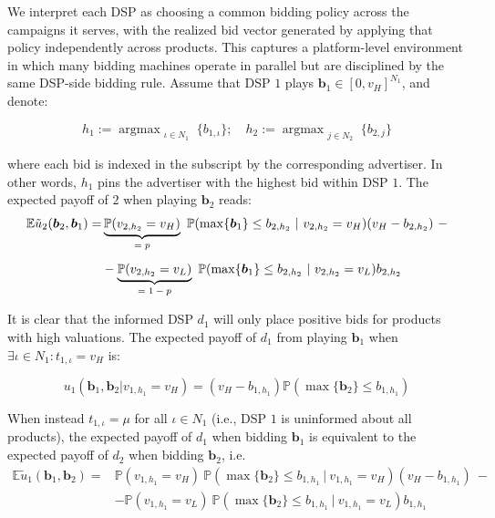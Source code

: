 \documentclass[11pt]{article}
\DeclareMathOperator*{\argmax}{argmax}
\theoremstyle{plain}
\theoremstyle{definition}
\theoremstyle{plain}
\theoremstyle{plain}
\theoremstyle{plain}
\theoremstyle{plain}
\numberwithin{equation}{section}
\begin{document}
\noindent We interpret each DSP as choosing a common bidding policy across the campaigns it serves, with the realized bid vector generated by applying that policy independently across products. This captures a platform-level environment in which many bidding machines operate in parallel but are disciplined by the same DSP-side bidding rule. Assume that DSP $1$ plays $ \bm{b}_1 \in [0,v_H]^{N_1} $, and denote:

\begin{equation*}
h_1 := \argmax_{\substack{\iota \in N_1}} \{ b_{1, \iota }\}; \quad h_2 := \argmax_{\substack{j \in N_2}} \{ b_{2, j} \}
\end{equation*}

\vspace{0.2cm}

\noindent where each bid is indexed in the subscript by the corresponding advertiser. In other words, $h_1$ pins the advertiser with the highest bid within DSP $1$. The expected payoff of $ 2 $ when playing $ \bm{b}_2$ reads:
\begin{align*}
\mathbb{E} \tilde{u}_2 (\bm{b}_2, \bm{b}_1) = & \underbrace{\mathbb{P}(v_{2,h_2} = v_H)}_\text{$ = p $} \ \mathbb{P}(\max \{ \bm{b}_1 \} \leq b_{2, h_2} \ | \ v_{2,h_2} = v_H) (v_H - b_{2, h_2}) \ - \\[5pt]
&- \underbrace{\mathbb{P}(v_{2,h_2} = v_L)}_\text{$ = 1 - p $} \ \mathbb{P}(\max \{ \bm{b}_1 \} \leq b_{2, h_2} \ | \ v_{2,h_2}  = v_L) b_{2, h_2}
\end{align*}

\vspace{0.2cm}

\noindent It is clear that the informed DSP $ d_1 $ will only place positive bids for products with high valuations. The expected payoff of $ d_1 $ from playing $ \bm{b}_1 $ when $\exists \iota \in N_1 : t_{1,\iota} = v_H $ is:

\begin{equation*}
    u_1(\bm{b}_1, \bm{b}_2 | v_{1,h_1} = v_H) = \left( v_H - b_{1,h_1} \right) \mathbb{P}\left( \max\{ \bm{b}_2 \} \leq b_{1,h_1} \right)
\end{equation*}

\vspace{0.4cm}

\noindent When instead $t_{1,\iota} = \mu$ for all $\iota \in N_1$ (i.e., DSP $1$ is uninformed about all products), the expected payoff of $ d_1 $ when bidding $ \bm{b}_1 $ is equivalent to the expected payoff of $d_2$ when bidding $ \bm{b}_2$, i.e.
\begin{align*}
\mathbb{E} \tilde{u}_1 (\bm{b}_1, \bm{b}_2) = & \mathbb{P}(v_{1,h_1} = v_H) \ \mathbb{P}(\max \{ \bm{b}_2 \} \leq b_{1, h_1} \ | \ v_{1,h_1} = v_H) (v_H - b_{1, h_1}) \ - \\[5pt]
&- \mathbb{P}(v_{1,h_1} = v_L) \ \mathbb{P}(\max \{ \bm{b}_2 \} \leq b_{1, h_1} \ | \ v_{1,h_1} = v_L) b_{1, h_1}
\end{align*}
\end{document}
